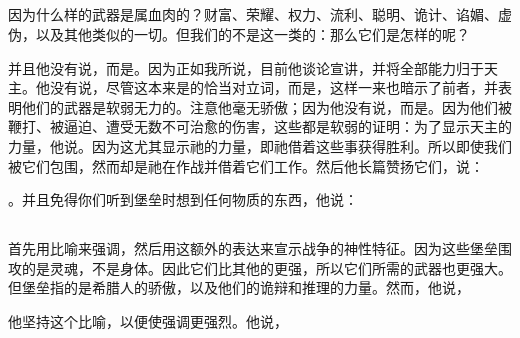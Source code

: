 
\subsection{}

\par

因为什么样的武器是属血肉的？财富、荣耀、权力、流利、聪明、诡计、谄媚、虚伪，以及其他类似的一切。但我们的不是这一类的：那么它们是怎样的呢？\par

\par

并且他没有说，而是。因为正如我所说，目前他谈论宣讲，并将全部能力归于天主。他没有说，尽管这本来是的恰当对立词，而是，这样一来也暗示了前者，并表明他们的武器是软弱无力的。注意他毫无骄傲；因为他没有说，而是。因为他们被鞭打、被逼迫、遭受无数不可治愈的伤害，这些都是软弱的证明：为了显示天主的力量，他说。因为这尤其显示祂的力量，即祂借着这些事获得胜利。所以即使我们被它们包围，然而却是祂在作战并借着它们工作。然后他长篇赞扬它们，说：\par

。并且免得你们听到堡垒时想到任何物质的东西，他说：\par


\subsection{}

\par

首先用比喻来强调，然后用这额外的表达来宣示战争的神性特征。因为这些堡垒围攻的是灵魂，不是身体。因此它们比其他的更强，所以它们所需的武器也更强大。但堡垒指的是希腊人的骄傲，以及他们的诡辩和推理的力量。然而，他说，\par

 他坚持这个比喻，以便使强调更强烈。他说，\par

